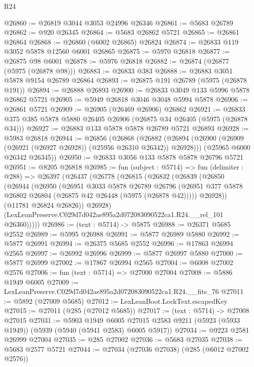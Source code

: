 \begin{lexlean}{R24}
\begin{coremodule}
@26860 := @26819 @3044 @3053 @24996 @26346
@26861 := @5683 @26789
@26862 := @920 @26345
@26864 := @5683 @26862 @5721
@26865 := @26861 @26864
@26868 := @26860 (@6002 @26865) @26824
@26874 := @26833 @119 @3052 @5878 @12560 @6001 @26865
@26875 := @5970 @26818
@26877 := @26875 @98 @6001
@26878 := @5976 @26818
@26882 := @26874 (@26877 (@5975 (@26878 @98)))
@26883 := @26833 @383
@26888 := @26883 @3051 @5878 @9154 @26789 @26864
@26893 := @26875 @191 @26789 (@5975 (@26878 @191))
@26894 := @26888 @26893
@26900 := @26833 @3049 @133 @5996 @5878 @26862 @5721
@26905 := @5949 @26818 @3046 @3048 @5994 @5878
@26906 := @26861 @5721
@26909 := @26905 (@26469 @26906) @26862
@26921 := @26833 @375 @385 @5878 @5880 @26405 @26906 (@26875 @34 @26405 (@5975 (@26878 @34)))
@26927 := @26883 @133 @5878 @5878 @26789 @5721 @26893
@26928 := @5983 @26818
@26944 := @26856
    (@26868
      (@26882 (@26894 (@26900 (@26909 (@26921 (@26927 @26928)) (@25956 @26310 @26342)) @26928)))
      (@25965 @6000 @26342 @26345))
@26950 := @26833 @3056 @133 @5878 @5878 @26796 @5721
@26951 := @8205 @26818
@26985 := fun (subject : @5714) =>
  fun (delimiter : @288) =>
  @26397
    (@26437
      (@26778
        (@26815
          (@26832
            (@26839
              (@26850
                (@26944
                  (@26950
                    (@26951
                      @3033
                      @5878
                      @26789
                      @26796
                      (@26951 @377 @5878 @26802 @26804 (@26875 @42 @26448 (@5975 (@26878 @42)))))
                    @26928))
                (@11781 @26824 @26826))
              @26928)
            (LexLeanPreserve.C029d7d042ae895a2d072083090522ca1.R24.__rel_101 @26360)))))
@26986 := (text : @5714) -> @5875
@26988 := @26371 @5685 @2552
@26989 := @5995 @26988
@26991 := @5877 @26989 @5880
@26992 := @5877 @26991
@26994 := @26375 @5685 @2552
@26996 := @17863 @26994 @2565
@26997 := @26992 @26996
@26999 := @5877 @26997 @5880
@27000 := @5877 @26999
@27002 := @17867 @26994 @2565
@27004 := @6008 @27002 @2576
@27006 := fun (text : @5714) => @27000 @27004
@27008 := @5886 @1949 @6005
@27009 := LexLeanPreserve.C029d7d042ae895a2d072083090522ca1.R24.__fits_76
@27011 := @5892 (@27009 @5685)
@27012 := LexLeanBoot.LockText.escapedKey
@27015 := @27011 (@285 (@27012 @5685))
@27017 := (text : @5714) -> @27008 @27015
@27031 := @5903
    @1949
    @6005
    @27015
    @2583
    @9211
    (@5923 (@5933 @1949))
    (@5939 (@5940 (@5941 @2583) @6005 @5917))
@27034 := @9223 @2581 @26999 @27004
@27035 := @285 @27002
@27036 := @5683 @27035
@27038 := @5683 @2577 @5721
@27044 := @27034 (@27036 @27038) (@285 (@6012 @27002 @2576))

\end{coremodule}
\end{lexlean}
